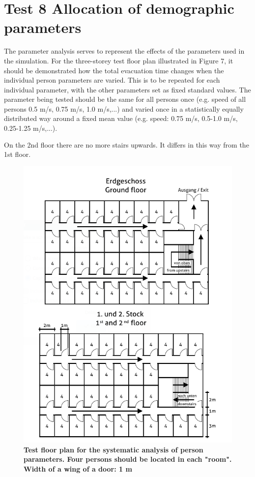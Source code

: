 \section*{Test 8 Allocation of demographic parameters}

The parameter analysis serves to represent the effects of the parameters used in the simulation. For the three-storey test floor plan illustrated in Figure 7, it should be demonstrated how the total evacuation time changes when the individual person parameters are varied. This is to be repeated for each individual parameter, with the other parameters set as fixed standard values. The parameter being tested should be the same for all persons once (e.g. speed of all persons 0.5 m/s, 0.75 m/s, 1.0 m/s,...) and varied once in a statistically equally distributed way around a fixed mean value (e.g. speed: 0.75 m/s, 0.5-1.0 m/s, 0.25-1.25 m/s,...).

\noindent
On the 2nd floor there are no more stairs upwards. It differs in this way from the 1st floor.


\begin{figure}[h]
	\centering
	\includegraphics[scale=0.5]{test_description/Test_floor_plan_test_8.png}
	\caption{\footnotesize \textbf{Test floor plan for the systematic analysis of person parameters. Four persons should be located in each "room". Width of a wing of a door: 1 m}}
\end{figure}


